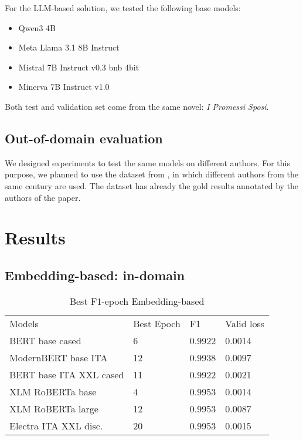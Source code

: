 \documentclass[11pt]{article}
\begin{document}
For the LLM-based solution, we tested the following base models:

 \begin{itemize}
 	\item Qwen3 4B
	\item Meta Llama 3.1 8B Instruct
	\item Mistral 7B Instruct v0.3 bnb 4bit
	\item Minerva 7B Instruct v1.0
\end{itemize}

Both test and validation set come from the same novel: \emph{I Promessi Sposi}. 

\subsection{Out-of-domain evaluation}

We designed experiments to test the same models on different authors.
For this purpose, we planned to use the dataset from \cite{redaelli-sprugnoli-2024-sentence}, in which different authors
from the same century are used.
The dataset has already the gold results annotated by the authors of the paper.

\section{Results}

\subsection{Embedding-based: in-domain}

\begin{table}[]
	\small
	\caption{Best F1-epoch Embedding-based}
	\begin{tabular}{llll}
		Models & Best Epoch & F1 & Valid loss \\
		BERT base cased & 6      & 0.9922        & 0.0014                  \\
		ModernBERT base ITA  & 12      & 0.9938        & 0.0097                  \\
		BERT base ITA XXL cased & 11      & 0.9922        & 0.0021                 \\
		XLM RoBERTa base & 4       & 0.9953        & 0.0014                  \\
		XLM RoBERTa large & 12       & 0.9953       & 0.0087                 \\
		Electra ITA XXL disc. & 20       & 0.9953        & 0.0015                
	\end{tabular}
	\label{t1}
\end{table}
\end{document}
